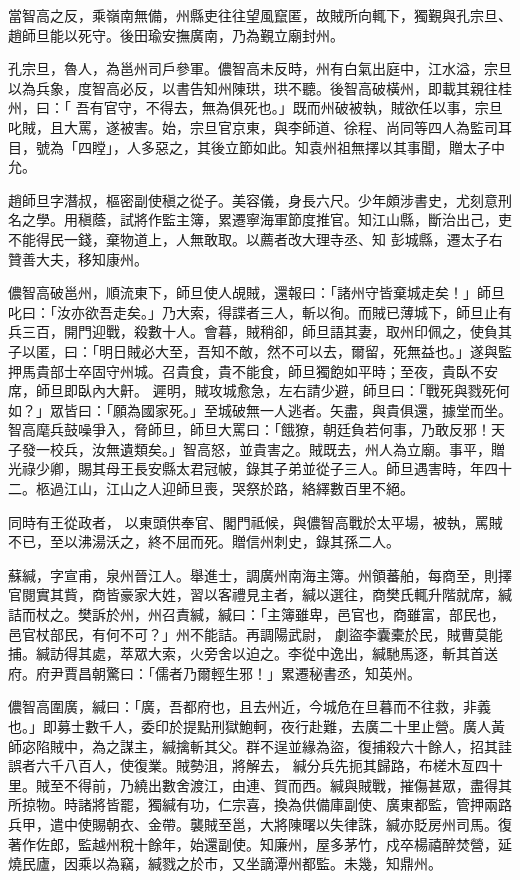 \begin{pinyinscope}
 當智高之反，乘嶺南無備，州縣吏往往望風竄匿，故賊所向輒下，獨覲與孔宗旦、趙師旦能以死守。後田瑜安撫廣南，乃為覲立廟封州。



 孔宗旦，魯人，為邕州司戶參軍。儂智高未反時，州有白氣出庭中，江水溢，宗旦以為兵象，度智高必反，以書告知州陳珙，珙不聽。後智高破橫州，即載其親往桂州，曰：「
 吾有官守，不得去，無為俱死也。」既而州破被執，賊欲任以事，宗旦叱賊，且大罵，遂被害。始，宗旦官京東，與李師道、徐程、尚同等四人為監司耳目，號為「四瞠」，人多惡之，其後立節如此。知袁州祖無擇以其事聞，贈太子中允。



 趙師旦字潛叔，樞密副使稹之從子。美容儀，身長六尺。少年頗涉書史，尤刻意刑名之學。用稹蔭，試將作監主簿，累遷寧海軍節度推官。知江山縣，斷治出己，吏不能得民一錢，棄物道上，人無敢取。以薦者改大理寺丞、知
 彭城縣，遷太子右贊善大夫，移知康州。



 儂智高破邕州，順流東下，師旦使人覘賊，還報曰：「諸州守皆棄城走矣！」師旦叱曰：「汝亦欲吾走矣。」乃大索，得諜者三人，斬以徇。而賊已薄城下，師旦止有兵三百，開門迎戰，殺數十人。會暮，賊稍卻，師旦語其妻，取州印佩之，使負其子以匿，曰：「明日賊必大至，吾知不敵，然不可以去，爾留，死無益也。」遂與監押馬貴部士卒固守州城。召貴食，貴不能食，師旦獨飽如平時；至夜，貴臥不安席，師旦即臥內大鼾。
 遲明，賊攻城愈急，左右請少避，師旦曰：「戰死與戮死何如？」眾皆曰：「願為國家死。」至城破無一人逃者。矢盡，與貴俱還，據堂而坐。智高麾兵鼓噪爭入，脅師旦，師旦大罵曰：「餓獠，朝廷負若何事，乃敢反邪！天子發一校兵，汝無遺類矣。」智高怒，並貴害之。賊既去，州人為立廟。事平，贈光祿少卿，賜其母王長安縣太君冠帔，錄其子弟並從子三人。師旦遇害時，年四十二。柩過江山，江山之人迎師旦喪，哭祭於路，絡繹數百里不絕。



 同時有王從政者，
 以東頭供奉官、閣門祗候，與儂智高戰於太平場，被執，罵賊不已，至以沸湯沃之，終不屈而死。贈信州刺史，錄其孫二人。



 蘇緘，字宣甫，泉州晉江人。舉進士，調廣州南海主簿。州領蕃舶，每商至，則擇官閱實其貲，商皆豪家大姓，習以客禮見主者，緘以選往，商樊氏輒升階就席，緘詰而杖之。樊訴於州，州召責緘，緘曰：「主簿雖卑，邑官也，商雖富，部民也，邑官杖部民，有何不可？」州不能詰。再調陽武尉，
 劇盜李囊橐於民，賊曹莫能捕。緘訪得其處，萃眾大索，火旁舍以迫之。李從中逸出，緘馳馬逐，斬其首送府。府尹賈昌朝驚曰：「儒者乃爾輕生邪！」累遷秘書丞，知英州。



 儂智高圍廣，緘曰：「廣，吾都府也，且去州近，今城危在旦暮而不往救，非義也。」即募士數千人，委印於提點刑獄鮑軻，夜行赴難，去廣二十里止營。廣人黃師宓陷賊中，為之謀主，緘擒斬其父。群不逞並緣為盜，復捕殺六十餘人，招其詿誤者六千八百人，使復業。賊勢沮，將解去，
 緘分兵先扼其歸路，布槎木亙四十里。賊至不得前，乃繞出數舍渡江，由連、賀而西。緘與賊戰，摧傷甚眾，盡得其所掠物。時諸將皆罷，獨緘有功，仁宗喜，換為供備庫副使、廣東都監，管押兩路兵甲，遣中使賜朝衣、金帶。襲賊至邕，大將陳曙以失律誅，緘亦貶房州司馬。復著作佐郎，監越州稅十餘年，始還副使。知廉州，屋多茅竹，戍卒楊禧醉焚營，延燒民廬，因乘以為竊，緘戮之於市，又坐謫潭州都監。未幾，知鼎州。




\end{pinyinscope}
